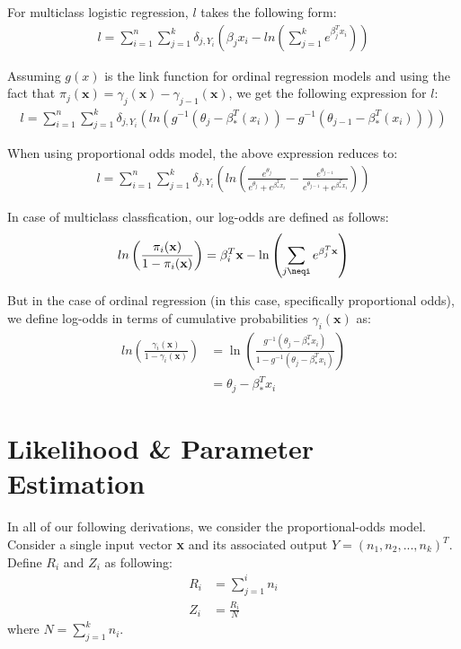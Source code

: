 \documentclass[a4paper, 11pt]{article}
\begin{document}
For multiclass logistic regression, $l$ takes the following form:
\begin{align}
    l = \sum_{i=1}^n \sum_{j=1}^k \delta_{j,Y_i} \left(\beta_jx_i - ln\left(\sum_{j=1}^k e^{\beta_j^T{x_i}}\right)\right)
\end{align}

Assuming $g(x)$ is the link function for ordinal regression models and using the fact that $\pi_j(\textbf{x}) = \gamma_j(\textbf{x}) - \gamma_{j-1}(\textbf{x})$, we get the following expression for $l$:
\begin{align}
    l = \sum_{i=1}^n \sum_{j=1}^k \delta_{j,Y_i} \left(ln(g^{-1}(\theta_j - \beta_*^T(x_i)) - g^{-1}(\theta_{j-1} - \beta_*^T(x_i)))\right)
\end{align}

When using proportional odds model, the above expression reduces to:
\begin{align}
    l = \sum_{i=1}^n \sum_{j=1}^k \delta_{j,Y_i} \left(ln\left(\frac{e^{\theta_j}}{e^{\theta_j} + e^{\beta_*^Tx_i}} - \frac{e^{\theta_{j-1}}}{e^{\theta_{j-1}} + e^{\beta_*^Tx_i}}\right)\right)
\end{align}

In case of multiclass classfication, our log-odds are defined as follows:
\begin{align}
    ln\left( \frac{\pi_i(\textbf{x})}{1 - \pi_i(\textbf{x})} \right) = \beta_i^T\textbf{x} - \ln\left( \sum_{j\neqi}e^{\beta_j^T\textbf{x}} \right)
\end{align}

But in the case of ordinal regression (in this case, specifically proportional odds), we define log-odds in terms of cumulative probabilities $\gamma_i(\textbf{x})$ as:
\begin{align}
    ln\left( \frac{\gamma_i(\textbf{x})}{1 - \gamma_i(\textbf{x})} \right) &= \ln\left( \frac{g^{-1}(\theta_j - \beta_*^Tx_i)}{1 - g^{-1}(\theta_j - \beta_*^Tx_i)}\right) \\
    &= \theta_j - \beta_*^Tx_i
\end{align}


\section{Likelihood \& Parameter Estimation}
In all of our following derivations, we consider the proportional-odds model. Consider a single input vector \textbf{x} and its associated output $Y = (n_1, n_2, ..., n_k)^T$. Define $R_i$ and $Z_i$ as following:
\begin{align}
    R_i &= \sum_{j=1}^i n_i \\
    Z_i &= \frac{R_i}{N} 
\end{align}
where $N = \sum_{j=1}^k n_i$. \newline
\end{document}
